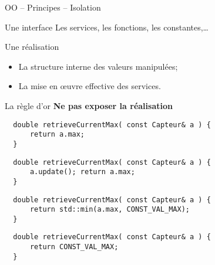 \documentclass[compress,10pt,aspectratio=169]{beamer}
\begin{document}
  \begin{frame}[fragile]{OO -- Principes -- Isolation}
  \scriptsize

  \begin{multicols}{2}
  \begin{block}{\small Une interface}
  Les services, les fonctions, les constantes,\ldots
  \end{block}
  \columnbreak  
  \begin{block}{\small Une réalisation}
  \begin{itemize}
  \item La structure interne des valeurs manipulées;
  \item La mise en œuvre effective des services.
  \end{itemize}
  \end{block}
\end{multicols}
  
  \begin{block}{\small La règle d'or}
  \alert{\bf Ne pas exposer la réalisation}
  
  \begin{minipage}{0.49\textwidth}
  \begin{verbatim}
  double retrieveCurrentMax( const Capteur& a ) {
      return a.max;
  }
  \end{verbatim}
  
  \begin{verbatim}
  double retrieveCurrentMax( const Capteur& a ) {
      a.update(); return a.max;
  }
  \end{verbatim}
  \end{minipage}
  \begin{minipage}{0.49\textwidth}
  \begin{verbatim}
  double retrieveCurrentMax( const Capteur& a ) {
      return std::min(a.max, CONST_VAL_MAX);
  }
  \end{verbatim}
  \begin{verbatim}
  double retrieveCurrentMax( const Capteur& a ) {
      return CONST_VAL_MAX;
  }
  \end{verbatim}
  \end{minipage}
  \end{block}
  \end{frame}
\end{document}
